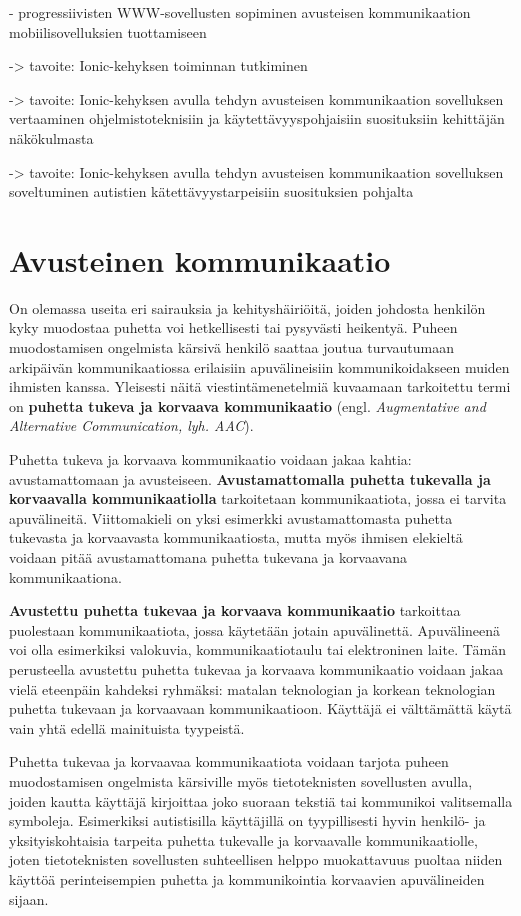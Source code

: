 \documentclass[utf8]{gradu3}
\begin{document}
- progressiivisten WWW-sovellusten sopiminen avusteisen kommunikaation mobiilisovelluksien tuottamiseen

-> tavoite: Ionic-kehyksen toiminnan tutkiminen

-> tavoite: Ionic-kehyksen avulla tehdyn avusteisen kommunikaation sovelluksen vertaaminen ohjelmistoteknisiin ja käytettävyyspohjaisiin suosituksiin kehittäjän näkökulmasta

-> tavoite: Ionic-kehyksen avulla tehdyn avusteisen kommunikaation sovelluksen soveltuminen autistien kätettävyystarpeisiin suosituksien pohjalta

\section{Avusteinen kommunikaatio}

On olemassa useita eri sairauksia ja kehityshäiriöitä, joiden johdosta henkilön kyky muodostaa puhetta voi hetkellisesti tai pysyvästi heikentyä. Puheen muodostamisen ongelmista kärsivä henkilö saattaa joutua turvautumaan arkipäivän kommunikaatiossa erilaisiin apuvälineisiin kommunikoidakseen muiden ihmisten kanssa. Yleisesti näitä viestintämenetelmiä kuvaamaan tarkoitettu termi on \textbf{puhetta tukeva ja korvaava kommunikaatio} (engl. \textit{Augmentative and Alternative Communication, lyh. AAC}).

Puhetta tukeva ja korvaava kommunikaatio voidaan jakaa kahtia: avustamattomaan ja avusteiseen. \textbf{Avustamattomalla puhetta tukevalla ja korvaavalla kommunikaatiolla} tarkoitetaan kommunikaatiota, jossa ei tarvita apuvälineitä. Viittomakieli on yksi esimerkki avustamattomasta puhetta tukevasta ja korvaavasta kommunikaatiosta, mutta myös ihmisen elekieltä voidaan pitää avustamattomana puhetta tukevana ja korvaavana kommunikaationa. 

\textbf{Avustettu puhetta tukevaa ja korvaava kommunikaatio} tarkoittaa puolestaan kommunikaatiota, jossa käytetään jotain apuvälinettä. Apuvälineenä voi olla esimerkiksi valokuvia, kommunikaatiotaulu tai elektroninen laite. Tämän perusteella avustettu puhetta tukevaa ja korvaava kommunikaatio voidaan jakaa vielä eteenpäin kahdeksi ryhmäksi: matalan teknologian ja korkean teknologian puhetta tukevaan ja korvaavaan kommunikaatioon. Käyttäjä ei välttämättä käytä vain yhtä edellä mainituista tyypeistä. \parencite[]{AAC-conditional-use}

Puhetta tukevaa ja korvaavaa kommunikaatiota voidaan tarjota puheen muodostamisen ongelmista kärsiville myös tietoteknisten sovellusten avulla, joiden kautta käyttäjä kirjoittaa joko suoraan tekstiä tai kommunikoi valitsemalla symboleja. Esimerkiksi autistisilla käyttäjillä on tyypillisesti hyvin henkilö- ja yksityiskohtaisia tarpeita puhetta tukevalle ja korvaavalle kommunikaatiolle, joten tietoteknisten sovellusten suhteellisen helppo muokattavuus puoltaa niiden käyttöä perinteisempien puhetta ja kommunikointia korvaavien apuvälineiden sijaan.
\end{document}
